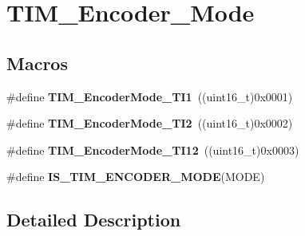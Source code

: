 \hypertarget{group___t_i_m___encoder___mode}{\section{T\-I\-M\-\_\-\-Encoder\-\_\-\-Mode}
\label{group___t_i_m___encoder___mode}
}
\subsection*{Macros}
\begin{DoxyCompactItemize}
\item 
\hypertarget{group___t_i_m___encoder___mode_gabc63e3617a938382f87439ec58768b8e}{\#define {\bfseries T\-I\-M\-\_\-\-Encoder\-Mode\-\_\-\-T\-I1}~((uint16\-\_\-t)0x0001)}\label{group___t_i_m___encoder___mode_gabc63e3617a938382f87439ec58768b8e}

\item 
\hypertarget{group___t_i_m___encoder___mode_ga5627a2d5d47b7301c7dbb29d20ae00e3}{\#define {\bfseries T\-I\-M\-\_\-\-Encoder\-Mode\-\_\-\-T\-I2}~((uint16\-\_\-t)0x0002)}\label{group___t_i_m___encoder___mode_ga5627a2d5d47b7301c7dbb29d20ae00e3}

\item 
\hypertarget{group___t_i_m___encoder___mode_ga12511f903de08f1a634ff7828757f081}{\#define {\bfseries T\-I\-M\-\_\-\-Encoder\-Mode\-\_\-\-T\-I12}~((uint16\-\_\-t)0x0003)}\label{group___t_i_m___encoder___mode_ga12511f903de08f1a634ff7828757f081}

\item 
\#define {\bfseries I\-S\-\_\-\-T\-I\-M\-\_\-\-E\-N\-C\-O\-D\-E\-R\-\_\-\-M\-O\-D\-E}(M\-O\-D\-E)
\end{DoxyCompactItemize}


\subsection{Detailed Description}


